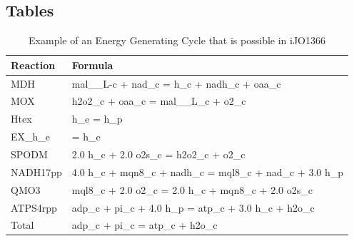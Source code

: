 \documentclass[twocolumn]{bmcart}%
\begin{document}
\begin{backmatter}




\section*{Tables}

\begin{table}[h!]
\caption{Example of an Energy Generating Cycle that is possible in iJO1366}
\begin{tabular}{l|l}
\label{table:egc_example}
Reaction & Formula\\\hline
MDH & mal\_\_L-c + nad\_c = h\_c + nadh\_c + oaa\_c\\
MOX	& h2o2\_c + oaa\_c = mal\_\_L\_c + o2\_c\\
Htex	& h\_e = h\_p\\
EX\_h\_e & = h\_e\\
SPODM & 2.0 h\_c + 2.0 o2s\_c = h2o2\_c + o2\_c\\
NADH17pp & 4.0 h\_c + mqn8\_c + nadh\_c = mql8\_c + nad\_c + 3.0 h\_p\\
QMO3 & mql8\_c + 2.0 o2\_c = 2.0 h\_c + mqn8\_c + 2.0 o2s\_c\\
ATPS4rpp & adp\_c + pi\_c + 4.0 h\_p = atp\_c + 3.0 h\_c + h2o\_c\\\hline
Total & adp\_c + pi\_c = atp\_c + h2o\_c
\end{tabular}
\end{table}



\end{backmatter}
\end{document}

